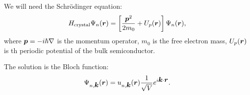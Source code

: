 We will need the Schr\"odinger equation:
\begin{equation*}
	H_{\text{crystal}} \Psi_n(\mbox{\boldmath $r$}) = \left[\frac{\mbox{\boldmath $p$}^2}{2 m_0} + U_p(\mbox{\boldmath $r$})\right] \Psi_n(\mbox{\boldmath $r$}),
\end{equation*}
where $\mbox{\boldmath $p$} = - i \hbar \nabla$ is the momentum operator, $m_0$ is the free electron mass, $U_p(\mbox{\boldmath $r$})$ is th periodic potential of the bulk semiconductor.

The solution is the Bloch function:
\begin{equation*}
	\Psi_{n, \mbox{\boldmath $k$}}(\mbox{\boldmath $r$}) = u_{n, \mbox{\boldmath $k$}}(\mbox{\boldmath $r$}) \frac{1}{\sqrt{V}} e^{i \mbox{\boldmath $k$} \cdot \mbox{\boldmath $r$}}.
\end{equation*}